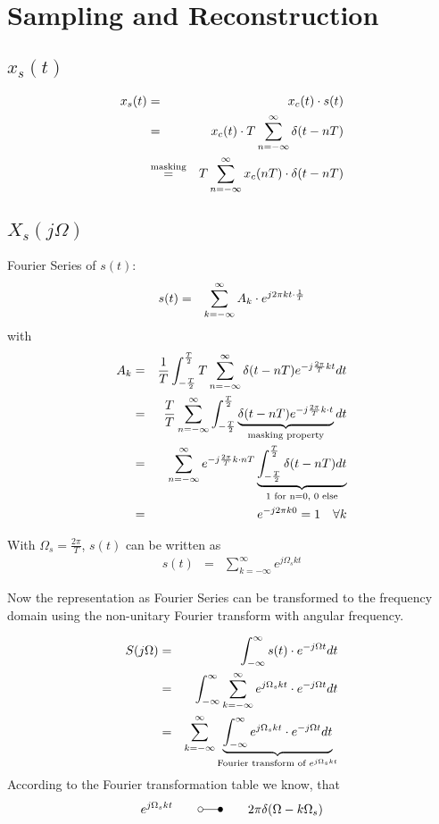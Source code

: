 \section{Sampling and Reconstruction} 

\subsection{$x_s(t)$}

\begin{eqnarray*}
x_s(t) & = & x_c(t) \cdot s(t) \\
       & = & x_c(t) \cdot T \sum_{n=-\infty}^{\infty} \delta (t-nT) \\
       & \overset{\text{masking}}{=}  & T \sum_{n=-\infty}^{\infty} x_c(nT) \cdot \delta (t-nT)
\end{eqnarray*}


\subsection{$X_s(j\Omega)$}

Fourier Series of $s(t)$:
\begin{eqnarray*}
s(t) & = & \sum_{k=-\infty}^{\infty} A_k \cdot e^{j2\pi k t \cdot \frac{1}{T}}
\end{eqnarray*}
with
\begin{eqnarray*}
A_k & = & \frac{1}{T} \int_{-\frac{T}{2}}^{\frac{T}{2}} T \sum_{n=-\infty}^{\infty} \delta (t-nT) e^{-j \frac{2\pi}{T}kt}  dt \\
& = & \frac{T}{T}  \sum_{n=-\infty}^{\infty} \int_{-\frac{T}{2}}^{\frac{T}{2}} \underbrace{\delta (t-nT) e^{-j \frac{2\pi}{T}k\cdot t}}_{\text{masking property}} dt \\
& = & \sum_{n=-\infty}^{\infty}  e^{-j \frac{2\pi}{T}k\cdot nT} \underbrace{\int_{-\frac{T}{2}}^{\frac{T}{2}}  \delta (t-nT) dt}_{\text{1 for n=0, 0 else}} \\
& = & e^{-j 2 \pi k 0 } = 1 \quad \forall k
\end{eqnarray*}

With $\Omega_s = \frac{2\pi}{T}$, $s(t)$ can be written as
\begin{eqnarray*}
s(t) & = & \sum_{k=-\infty}^{\infty} e^{j \Omega_s k t}
\end{eqnarray*}

Now the representation as Fourier Series can be transformed to the frequency domain using the non-unitary Fourier transform with angular frequency.

\begin{eqnarray*}
S(j\Omega) & = & \int_{-\infty}^{\infty} s(t) \cdot e^{-j \Omega t} dt \\
 & = & \int_{-\infty}^{\infty} \sum_{k=-\infty}^{\infty} e^{j \Omega_s k t} \cdot e^{-j \Omega t} dt \\
 & = & \sum_{k=-\infty}^{\infty}  \underbrace{\int_{-\infty}^{\infty} e^{j \Omega_s k t} \cdot e^{-j \Omega t} dt}_{\text{Fourier transform of }e^{j \Omega_s k t}}
\end{eqnarray*}
According to the Fourier transformation table we know, that
\begin{eqnarray*}
e^{j \Omega_s k t} \qquad \laplace \qquad 2\pi \delta(\Omega - k\Omega_s)
\end{eqnarray*}

